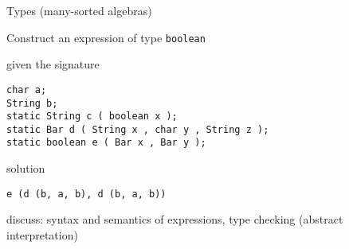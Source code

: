 \begin{slide}{Types (many-sorted algebras)}

Construct an expression of type \verb|boolean|  

given the signature
\begin{verbatim}
char a;
String b;
static String c ( boolean x );
static Bar d ( String x , char y , String z );
static boolean e ( Bar x , Bar y );
\end{verbatim}
\bigskip

solution
\begin{verbatim}
e (d (b, a, b), d (b, a, b))
\end{verbatim}

discuss: syntax and semantics of expressions,
type checking (abstract interpretation)

\end{slide}
